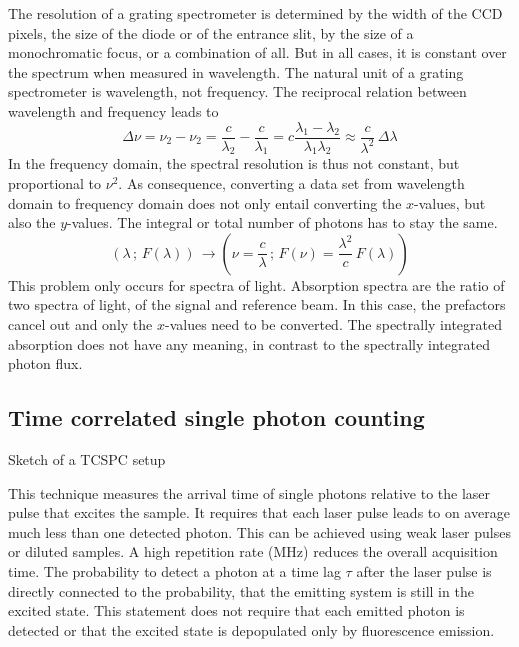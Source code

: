 The resolution of a grating spectrometer is determined by the width of the CCD pixels, the size of the diode or of the entrance slit, by the size of a monochromatic focus, or a combination of all. But in all cases, it is constant over the spectrum when measured in wavelength. The natural unit of a grating spectrometer is wavelength, not frequency. The reciprocal relation between wavelength and frequency leads to 
\begin{equation}
 \Delta \nu = \nu_2 - \nu_2 = \frac{c}{\lambda_2} - \frac{c}{\lambda_1}  = c \frac{\lambda_1 - \lambda_2}{\lambda_1 \lambda_2} \approx \frac{c}{\lambda^2} \, \Delta \lambda
\end{equation}
In the frequency domain, the spectral resolution is thus not constant, but proportional to $\nu^2$. As consequence, converting a data set from wavelength domain to frequency domain does not only entail converting the $x$-values, but also the $y$-values. The integral or total number of photons has to stay the same.
\begin{equation}
 \left( \lambda \, ; \, F(\lambda) \right) \, \rightarrow  \left( \nu = \frac{c}{ \lambda} \, ; \,  F(\nu) = \frac{\lambda^2}{ c } \, F(\lambda) \right) 
\end{equation}
This problem only occurs for spectra of light. Absorption spectra are the ratio of two spectra of light, of the signal and reference beam. In this case, the prefactors cancel out and only the $x$-values need to be converted. The spectrally integrated absorption does not have any meaning, in contrast to the spectrally integrated photon flux.



\subsection{Time correlated single photon counting}

\begin{marginfigure}

  \caption{Sketch of a TCSPC setup}
\end{marginfigure}

This technique measures the arrival time of single photons relative to the laser pulse that excites the sample. It requires that each laser pulse leads to on average much less than one detected photon. This can be achieved using weak laser pulses or diluted samples. A high repetition rate (MHz) reduces the overall acquisition time. The probability to detect a photon at a time lag $\tau$ after the laser pulse is directly connected to the probability, that the emitting system is still in the excited state. This statement does not require that each emitted photon is detected or that the excited state is depopulated only by fluorescence emission.






